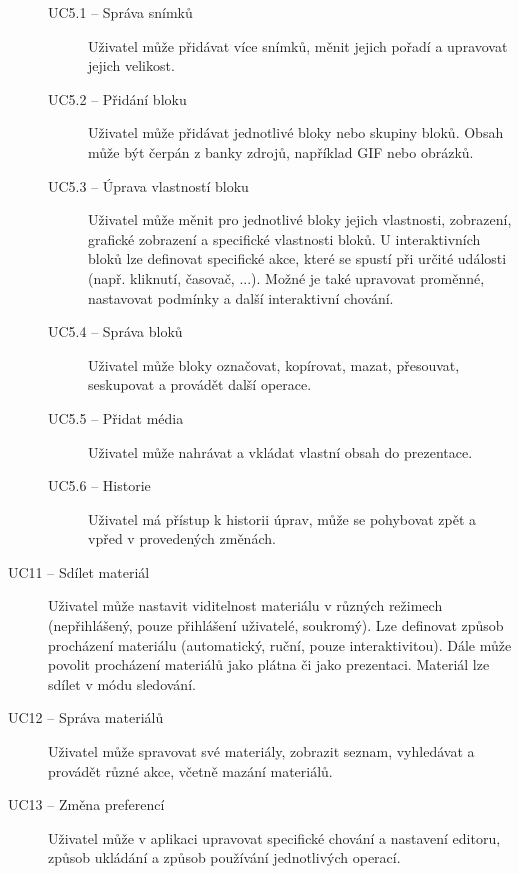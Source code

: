 \begin{description}
        \begin{description}
            \item[UC5.1 -- Správa snímků]
            Uživatel může přidávat více snímků, měnit jejich pořadí a upravovat jejich velikost.
            
            \item[UC5.2 -- Přidání bloku]
            Uživatel může přidávat jednotlivé bloky nebo skupiny bloků. Obsah může být čerpán z banky zdrojů, například GIF nebo obrázků.
            
            \item[UC5.3 -- Úprava vlastností bloku]
            Uživatel může měnit pro jednotlivé bloky jejich vlastnosti, zobrazení, grafické zobrazení a specifické vlastnosti bloků. U interaktivních bloků lze definovat specifické akce, které se spustí při určité události (např. kliknutí, časovač, ...). Možné je také upravovat proměnné, nastavovat podmínky a další interaktivní chování.
            
            \item[UC5.4 -- Správa bloků]
            Uživatel může bloky označovat, kopírovat, mazat, přesouvat, seskupovat a provádět další operace.
            
            \item[UC5.5 -- Přidat média]
            Uživatel může nahrávat a vkládat vlastní obsah do prezentace.
            
            \item[UC5.6 -- Historie]
            Uživatel má přístup k historii úprav, může se pohybovat zpět a vpřed v provedených změnách.
        \end{description}
    
    \item[UC11 -- Sdílet materiál]
    Uživatel může nastavit viditelnost materiálu v různých režimech (nepřihlášený, pouze přihlášení uživatelé, soukromý). Lze definovat způsob procházení materiálu (automatický, ruční, pouze interaktivitou). Dále může povolit procházení materiálů jako plátna či jako prezentaci. Materiál lze sdílet v módu sledování.
    
    \item[UC12 -- Správa materiálů]
    Uživatel může spravovat své materiály, zobrazit seznam, vyhledávat a provádět různé akce, včetně mazání materiálů.
    
    \item[UC13 -- Změna preferencí]
    Uživatel může v aplikaci upravovat specifické chování a nastavení editoru, způsob ukládání a způsob používání jednotlivých operací.


\end{description}
